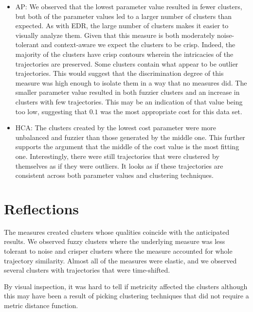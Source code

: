 \begin{itemize}

\item AP: We observed that the lowest parameter value resulted in fewer clusters, but both of the parameter values led to a larger number of clusters than expected.
As with EDR, the large number of clusters makes it easier to visually analyze them. 
Given that this measure is both moderately noise-tolerant and context-aware we expect the clusters to be crisp.
Indeed, the majority of the clusters have crisp contours wherein the intricacies of the trajectories are preserved.
Some clusters contain what appear to be outlier trajectories.
This would suggest that the discrimination degree of this measure was high enough to isolate them in a way that no measures did. 
The smaller parameter value resulted in both fuzzier clusters and an increase in clusters with few trajectories.
This may be an indication of that value being too low, suggesting that $0.1$ was the most appropriate cost for this data set. 

\medskip  
\item HCA: The clusters created by the lowest cost parameter were more unbalanced and fuzzier than those generated by the middle one. 
This further supports the argument that the middle of the cost value is the most fitting one. 
Interestingly, there were still trajectories that were clustered by themselves as if they were outliers. 
It looks as if these trajectories are consistent across both parameter values and clustering techniques. 

\end{itemize}





\section{Reflections}

The measures created clusters whose qualities coincide with the anticipated results. 
We observed fuzzy clusters where the underlying measure was less tolerant to noise and crisper clusters where the measure accounted for whole trajectory similarity.
Almost all of the measures were elastic, and we observed several clusters with trajectories that were time-shifted. 

By visual inspection, it was hard to tell if metricity affected the clusters although this may have been a result of picking clustering techniques that did not require a metric distance function. 

